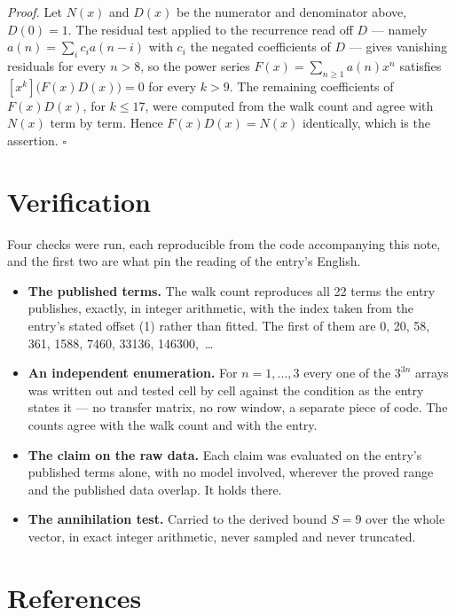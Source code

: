 \documentclass[11pt]{article}
\theoremstyle{definition}
\begin{document}
{\itshape Proof.} Let $N(x)$ and $D(x)$ be the numerator and denominator above, $D(0)=1$. The residual test applied to the recurrence read off $D$ --- namely $a(n) = \sum_i c_i a(n-i)$ with $c_i$ the negated coefficients of $D$ --- gives vanishing residuals for every $n > 8$, so the power series $F(x)=\sum_{n\ge 1}a(n)x^n$ satisfies $[x^k]\bigl(F(x)D(x)\bigr) = 0$ for every $k > 9$. The remaining coefficients of $F(x)D(x)$, for $k \le 17$, were computed from the walk count and agree with $N(x)$ term by term. Hence $F(x)D(x) = N(x)$ identically, which is the assertion. $\square$

\section{Verification}

Four checks were run, each reproducible from the code accompanying this note, and the first two are what pin the reading of the entry's English.

\begin{itemize}

\item {\bfseries The published terms.} The walk count reproduces all 22 terms the entry publishes, exactly, in integer arithmetic, with the index taken from the entry's stated offset (1) rather than fitted. The first of them are 0, 20, 58, 361, 1588, 7460, 33136, 146300,~\dots

\item {\bfseries An independent enumeration.} For $n = 1,\dots,3$ every one of the $3^{3n}$ arrays was written out and tested cell by cell against the condition as the entry states it --- no transfer matrix, no row window, a separate piece of code. The counts agree with the walk count and with the entry.

\item {\bfseries The claim on the raw data.} Each claim was evaluated on the entry's published terms alone, with no model involved, wherever the proved range and the published data overlap. It holds there.

\item {\bfseries The annihilation test.} Carried to the derived bound $S = 9$ over the whole vector, in exact integer arithmetic, never sampled and never truncated.

\end{itemize}

\section{References}
\end{document}
